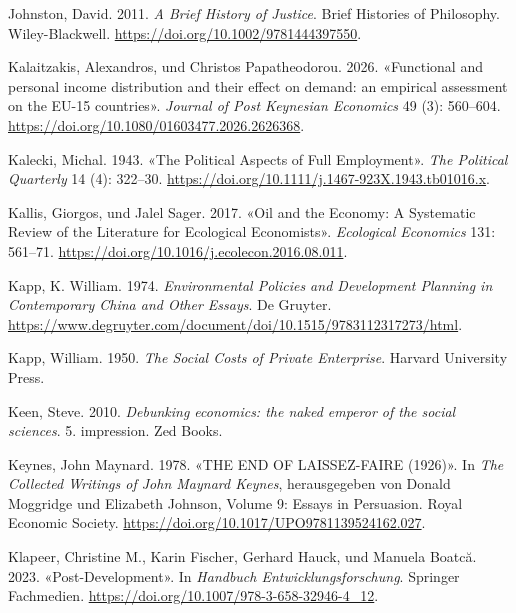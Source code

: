\documentclass[
  nswissgerman,
  a4paper,
  DIV=11,
  numbers=noendperiod,
  oneside,
  openany]{scrreprt}
\newlength{\cslhangindent}
\newenvironment{CSLReferences}[2] %
 {\begin{list}{}{%
  \setlength{\itemindent}{0pt}
  \setlength{\leftmargin}{0pt}
  \setlength{\parsep}{0pt}
  \ifodd #1
   \setlength{\leftmargin}{\cslhangindent}
   \setlength{\itemindent}{-1\cslhangindent}
  \fi
  \setlength{\itemsep}{#2\baselineskip}}}
 {\end{list}}
\begin{document}
\begin{CSLReferences}{1}{1}
Johnston, David. 2011. \emph{A {Brief} {History} of {Justice}}. Brief
{Histories} of {Philosophy}. Wiley-Blackwell.
\url{https://doi.org/10.1002/9781444397550}.

Kalaitzakis, Alexandros, und Christos Papatheodorou. 2026. {«Functional
and personal income distribution and their effect on demand: an
empirical assessment on the {EU}-15 countries»}. \emph{Journal of Post
Keynesian Economics} 49 (3): 560--604.
\url{https://doi.org/10.1080/01603477.2026.2626368}.

Kalecki, Michal. 1943. {«The {Political} {Aspects} of {Full}
{Employment}»}. \emph{The Political Quarterly} 14 (4): 322--30.
\url{https://doi.org/10.1111/j.1467-923X.1943.tb01016.x}.

Kallis, Giorgos, und Jalel Sager. 2017. {«Oil and the Economy: A
Systematic Review of the Literature for Ecological Economists»}.
\emph{Ecological Economics} 131: 561--71.
\url{https://doi.org/10.1016/j.ecolecon.2016.08.011}.

Kapp, K. William. 1974. \emph{Environmental Policies and Development
Planning in Contemporary China and Other Essays}. De Gruyter.
\url{https://www.degruyter.com/document/doi/10.1515/9783112317273/html}.

Kapp, William. 1950. \emph{The Social Costs of Private Enterprise}.
Harvard University Press.

Keen, Steve. 2010. \emph{Debunking economics: the naked emperor of the
social sciences}. 5. impression. Zed Books.

Keynes, John Maynard. 1978. {«{THE} {END} {OF} {LAISSEZ}-{FAIRE}
(1926)»}. In \emph{The {Collected} {Writings} of {John} {Maynard}
{Keynes}}, herausgegeben von Donald Moggridge und Elizabeth Johnson,
Volume 9: Essays in Persuasion. Royal Economic Society.
\url{https://doi.org/10.1017/UPO9781139524162.027}.

Klapeer, Christine M., Karin Fischer, Gerhard Hauck, und Manuela Boatcă.
2023. {«Post-Development»}. In \emph{Handbuch Entwicklungsforschung}.
Springer Fachmedien. \url{https://doi.org/10.1007/978-3-658-32946-4_12}.


\end{CSLReferences}
\end{document}

